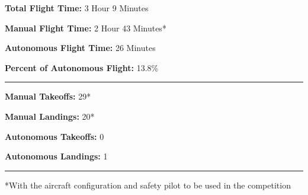 \documentclass[]{auvsi_doc}
\begin{document}
\textbf{Total Flight Time:} 3 Hour 9 Minutes 

\textbf{Manual Flight Time:} 2 Hour 43 Minutes*

\textbf{Autonomous Flight Time:} 26 Minutes

\textbf{Percent of Autonomous Flight:} 13.8\%

\hrule
\textbf{Manual Takeoffs:} 29*

\textbf{Manual Landings:} 20*

\textbf{Autonomous Takeoffs:} 0

\textbf{Autonomous Landings:} 1

\hrule
*With the aircraft configuration and safety pilot to be used in the competition
\end{document}
